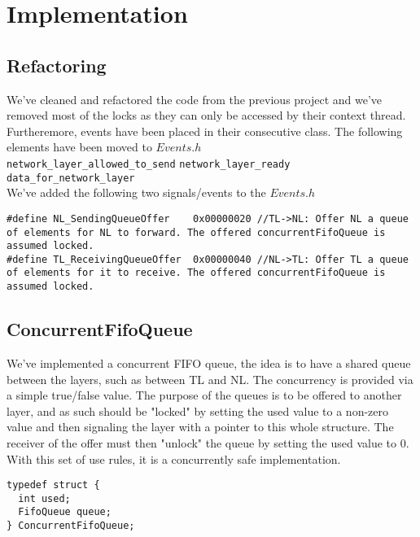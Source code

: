 \section{Implementation}

\subsection{Refactoring}

We've cleaned and refactored the code from the previous project and we've removed most of the locks as they can only be accessed by their context thread.
Furtheremore, events have been placed in their consecutive class.
The following elements have been moved to $Events.h$
\break
\\
\texttt{network\_layer\_allowed\_to\_send}
\break
\texttt{network\_layer\_ready}
\break
\texttt{data\_for\_network\_layer}
\\

We've added the following two signals/events to the $Events.h$

\begin{lstlisting}
#define NL_SendingQueueOffer    0x00000020 //TL->NL: Offer NL a queue of elements for NL to forward. The offered concurrentFifoQueue is assumed locked.
#define TL_ReceivingQueueOffer  0x00000040 //NL->TL: Offer TL a queue of elements for it to receive. The offered concurrentFifoQueue is assumed locked.
\end{lstlisting}


\subsection{ConcurrentFifoQueue}

We've implemented a concurrent FIFO queue, the idea is to have a shared queue between the layers, such as between TL and NL.
The concurrency is provided via a simple true/false value. The purpose of the queues is to be offered to another layer, and as such should be "locked" by setting the used value to a non-zero value and then signaling the layer with a pointer to this whole structure. The receiver of the offer must then "unlock" the queue by setting the used value to 0. With this set of use rules, it is a concurrently safe implementation.
\begin{lstlisting}
typedef struct {
  int used;
  FifoQueue queue;
} ConcurrentFifoQueue;
\end{lstlisting}



